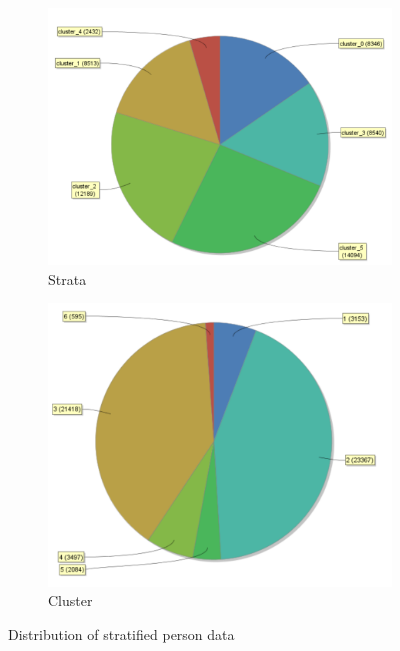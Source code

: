 \begin{figure}[H]
	\vspace{-3em}
	\centering
	\begin{subfigure}{.43\textwidth}
		\centering
		\includegraphics[width=.9\linewidth]{vectorclusteringcluster.PNG}
		\caption{Strata}
		\label{fig:VecSt}
	\end{subfigure}%
	\begin{subfigure}{.4\textwidth}
		\centering
		\includegraphics[width=.9\linewidth]{vectorclusteringstrata.PNG}
		\caption{Cluster}
		\label{fig:VecCl}
	\end{subfigure}
	\caption{Distribution of stratified person data}
	\label{fig:VecDist}
\end{figure}

